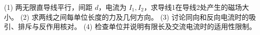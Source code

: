 (1) 两无限直导线平行，间距 \(d\)，电流为 \(I_1,I_2\)，求导线1在导线2处产生的磁场大小。
(2) 求两线之间每单位长度的力及几何方向。
(3) 讨论同向和反向电流时的吸引、排斥与反作用核对。
(4) 检查单位并说明有限长及交流电流时的适用性限制。
